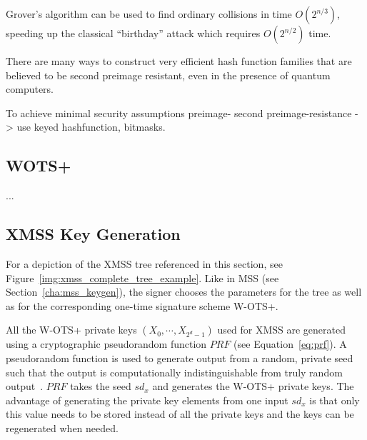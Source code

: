 Grover’s algorithm can be used to find ordinary collisions in time $O(2^{n/3})$, speeding up the classical “birthday” attack which requires $O(2^{n/2})$ time.


There are many ways to construct very efficient hash function families that are believed to be second preimage resistant, even in the presence of quantum computers.~\cite{xmss_paper_2011}

To achieve minimal security assumptions preimage- second preimage-resistance -> use keyed hashfunction, bitmasks. %

\subsection{WOTS+}
...



\subsection{XMSS Key Generation}
For a depiction of the XMSS tree referenced in this section, see Figure~\ref{img:xmss_complete_tree_example}. 
Like in MSS (see Section~\ref{cha:mss_keygen}), the signer chooses the parameters for the tree as well as for the corresponding one-time signature scheme W-OTS+.

All the W-OTS+ private keys $(X_0, \cdots, X_{2^d-1})$ used for XMSS are generated using a cryptographic pseudorandom function $PRF$ (see Equation~\ref{eq:prf}). 
A pseudorandom function is used to generate output from a random, private  
seed such that the output is computationally indistinguishable from truly random output~\cite{PRF_source_2016sha}. $PRF$ takes the seed $sd_x$ and generates the W-OTS+ private keys. %
The advantage of generating the private key elements from one input $sd_x$ is that only this value needs to be stored instead of all the private keys and the keys can be regenerated when needed. %

